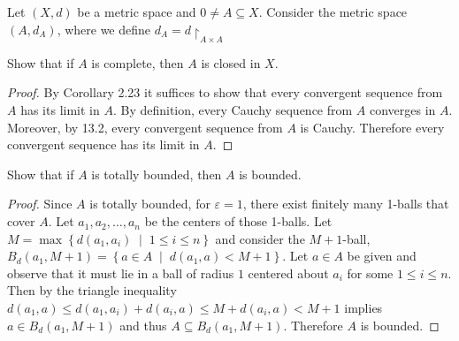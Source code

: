 \documentclass[12pt]{amsart}
\begin{document}
\begin{setup}
  Let $(X,d)$ be a metric space and $0 \not = A \subseteq X$.
  Consider the metric space $(A, d_A)$, where we define $d_A = d\restriction_{A \times A}$
  \begin{ex}
    Show that if $A$ is complete, then $A$ is closed in $X$.
    \begin{proof}
      By Corollary 2.23 it suffices to show that every convergent sequence from $A$ has its limit in $A$.
      By definition, every Cauchy sequence from $A$ converges in $A$.
      Moreover, by 13.2, every convergent sequence from $A$ is Cauchy.
      Therefore every convergent sequence has its limit in $A$.
    \end{proof}
  \end{ex}

  \begin{ex}
    Show that if $A$ is totally bounded, then $A$ is bounded.
    \begin{proof}
      Since $A$ is totally bounded, for $\varepsilon = 1$, there exist finitely many 1-balls that cover $A$.
      Let $a_1, a_2, \ldots, a_n$ be the centers of those 1-balls.
      Let $M = \max \left\{d(a_1, a_i) \;\middle\vert\; 1 \leq i \leq n\right\}$ and consider the $M+1$-ball, $B_d(a_1, M+1) = \left\{a \in A \;\middle\vert\; d(a_1, a) < M + 1\right\}$.
      Let $a \in A$ be given and observe that it must lie in a ball of radius $1$ centered about $a_i$ for some $1 \leq i \leq n$.
      Then by the triangle inequality $d(a_1, a) \leq d(a_1, a_i) + d(a_i, a) \leq M + d(a_i, a) < M + 1$ implies $a \in B_d(a_1, M+1)$ and thus $A \subseteq B_d(a_1, M+1)$.
      Therefore $A$ is bounded.
    \end{proof}
  \end{ex}
\end{setup}
\end{document}
